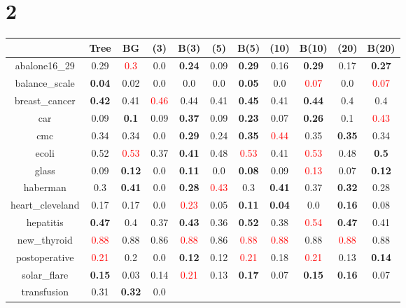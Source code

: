 \documentclass{article}%
\begin{document}
\section*{2}%
\begin{tabular}{c|cccccccccc}%
\hline%
&Tree&BG&(3)&B(3)&(5)&B(5)&(10)&B(10)&(20)&B(20)\\%
\hline%
abalone16\_29&0.29&\textcolor{red}{ 
0.3
}&0.0&\textbf{0.24}&0.09&\textbf{0.29}&0.16&\textbf{0.29}&0.17&\textbf{0.27}\\%
\hline%
balance\_scale&\textbf{0.04}&0.02&0.0&0.0&0.0&\textbf{0.05}&0.0&\textcolor{red}{ 
0.07
}&0.0&\textcolor{red}{ 
0.07
}\\%
\hline%
breast\_cancer&\textbf{0.42}&0.41&\textcolor{red}{ 
0.46
}&0.44&0.41&\textbf{0.45}&0.41&\textbf{0.44}&0.4&0.4\\%
\hline%
car&0.09&\textbf{0.1}&0.09&\textbf{0.37}&0.09&\textbf{0.23}&0.07&\textbf{0.26}&0.1&\textcolor{red}{ 
0.43
}\\%
\hline%
cmc&0.34&0.34&0.0&\textbf{0.29}&0.24&\textbf{0.35}&\textcolor{red}{ 
0.44
}&0.35&\textbf{0.35}&0.34\\%
\hline%
ecoli&0.52&\textcolor{red}{ 
0.53
}&0.37&\textbf{0.41}&0.48&\textcolor{red}{ 
0.53
}&0.41&\textcolor{red}{ 
0.53
}&0.48&\textbf{0.5}\\%
\hline%
glass&0.09&\textbf{0.12}&0.0&\textbf{0.11}&0.0&\textbf{0.08}&0.09&\textcolor{red}{ 
0.13
}&0.07&\textbf{0.12}\\%
\hline%
haberman&0.3&\textbf{0.41}&0.0&\textbf{0.28}&\textcolor{red}{ 
0.43
}&0.3&\textbf{0.41}&0.37&\textbf{0.32}&0.28\\%
\hline%
heart\_cleveland&0.17&0.17&0.0&\textcolor{red}{ 
0.23
}&0.05&\textbf{0.11}&\textbf{0.04}&0.0&\textbf{0.16}&0.08\\%
\hline%
hepatitis&\textbf{0.47}&0.4&0.37&\textbf{0.43}&0.36&\textbf{0.52}&0.38&\textcolor{red}{ 
0.54
}&\textbf{0.47}&0.41\\%
\hline%
new\_thyroid&\textcolor{red}{ 
0.88
}&0.88&0.86&\textcolor{red}{ 
0.88
}&0.86&\textcolor{red}{ 
0.88
}&\textcolor{red}{ 
0.88
}&0.88&\textcolor{red}{ 
0.88
}&0.88\\%
\hline%
postoperative&\textcolor{red}{ 
0.21
}&0.2&0.0&\textbf{0.12}&0.12&\textcolor{red}{ 
0.21
}&0.18&\textcolor{red}{ 
0.21
}&0.13&\textbf{0.14}\\%
\hline%
solar\_flare&\textbf{0.15}&0.03&0.14&\textcolor{red}{ 
0.21
}&0.13&\textbf{0.17}&0.07&\textbf{0.15}&\textbf{0.16}&0.07\\%
\hline%
transfusion&0.31&\textbf{0.32}&0.0&\textcolor{red}{ 
}
\end{tabular}
\end{document}
